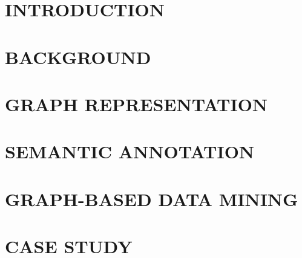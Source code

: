 \documentclass[dissertation,copyright,draftimages,final,numbers,sort&compress,gsmodern]{uothesis}
\author{Haishan Liu}
\theoremstyle{definition}
\theoremstyle{definition}
\begin{document}
\maketitle

\chapter{INTRODUCTION}
\label{chap:introduction}



\chapter{BACKGROUND}
\label{chap:background}



\chapter{GRAPH REPRESENTATION}
\label{chap:representation}



\chapter{SEMANTIC ANNOTATION}
\label{chap:annotation}



\chapter{GRAPH-BASED DATA MINING}
\label{chap:datamining}



%


\chapter{CASE STUDY}
\label{chap:casestudy}

\end{document}

